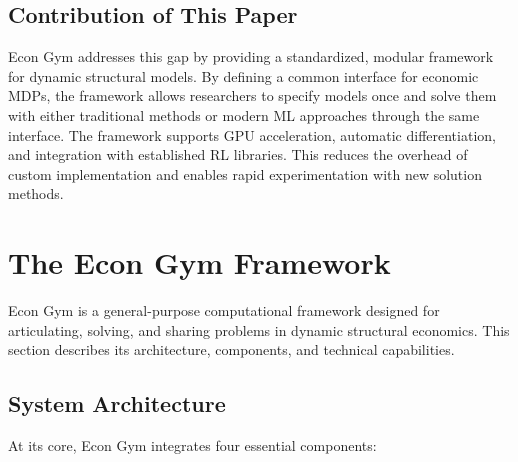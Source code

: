\documentclass[12pt]{article}
\begin{document}
\subsection{Contribution of This Paper}

Econ Gym addresses this gap by providing a standardized, modular framework for dynamic structural models. By defining a common interface for economic MDPs, the framework allows researchers to specify models once and solve them with either traditional methods or modern ML approaches through the same interface. The framework supports GPU acceleration, automatic differentiation, and integration with established RL libraries. This reduces the overhead of custom implementation and enables rapid experimentation with new solution methods.

\section{The Econ Gym Framework} \label{sec:framework}

Econ Gym is a general-purpose computational framework designed for articulating, solving, and sharing problems in dynamic structural economics. This section describes its architecture, components, and technical capabilities.

\subsection{System Architecture}

At its core, Econ Gym integrates four essential components:
\end{document}
